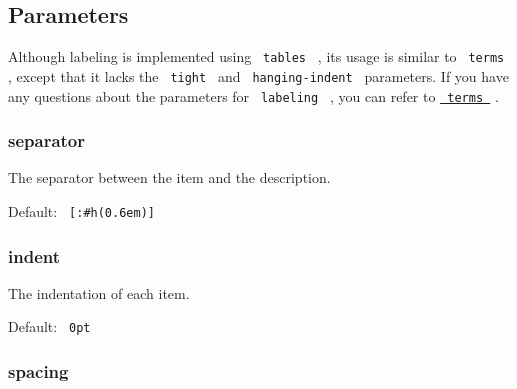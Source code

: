 \begin{Shaded}
\begin{Highlighting}[]

\NormalTok{  (}
\NormalTok{  )}
\NormalTok{)}
\end{Highlighting}
\end{Shaded}

\subsection{Parameters}\label{parameters}

Although labeling is implemented using \texttt{\ tables\ } , its usage
is similar to \texttt{\ terms\ } , except that it lacks the
\texttt{\ tight\ } and \texttt{\ hanging-indent\ } parameters. If you
have any questions about the parameters for \texttt{\ labeling\ } , you
can refer to
\href{https://typst.app/docs/reference/model/terms/}{\texttt{\ terms\ }}
.

\begin{Shaded}
\begin{Highlighting}[]
\NormalTok{)}
\end{Highlighting}
\end{Shaded}

\subsubsection{separator}\label{separator}

The separator between the item and the description.

Default: \texttt{\ {[}:\#h(0.6em){]}\ }

\subsubsection{indent}\label{indent}

The indentation of each item.

Default: \texttt{\ 0pt\ }

\subsubsection{spacing}\label{spacing}


